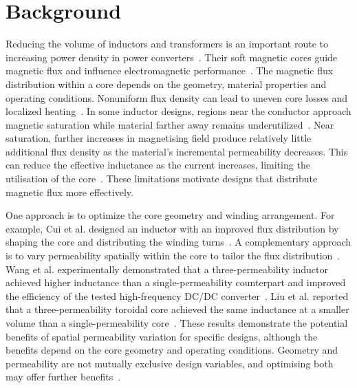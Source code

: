 \section{Background}

Reducing the volume of inductors and transformers is an important route to increasing power density in power converters~\cite{sullivanInvitedPassiveComponent2011}. Their soft magnetic cores guide magnetic flux and influence electromagnetic performance~\cite{valchevInductorsTransformersPower2018}. The magnetic flux distribution within a core depends on the geometry, material properties and operating conditions. Nonuniform flux density can lead to uneven core losses and localized heating~\cite{aghebModificationEmpiricalCore2013}. In some inductor designs, regions near the conductor approach magnetic saturation while material farther away remains underutilized~\cite{wangMultipermeabilityInductorsIncreasing2013}. Near saturation, further increases in magnetising field produce relatively little additional flux density as the material's incremental permeability decreases. This can reduce the effective inductance as the current increases, limiting the utilisation of the core~\cite{valchevInductorsTransformersPower2018,umetaniImprovementSaturationProperty2013}. These limitations motivate designs that distribute magnetic flux more effectively.

One approach is to optimize the core geometry and winding arrangement. For example, Cui et al. designed an inductor with an improved flux distribution by shaping the core and distributing the winding turns~\cite{cuiInductorGeometryImproved2014}. A complementary approach is to vary permeability spatially within the core to tailor the flux distribution~\cite{liuDesignAdditiveManufacturing2018,wangMultipermeabilityInductorsIncreasing2013}. Wang et al. experimentally demonstrated that a three-permeability inductor achieved higher inductance than a single-permeability counterpart and improved the efficiency of the tested high-frequency DC/DC converter~\cite{wangMultipermeabilityInductorsIncreasing2013}. Liu et al. reported that a three-permeability toroidal core achieved the same inductance at a smaller volume than a single-permeability core~\cite{liuDesignAdditiveManufacturing2018}. These results demonstrate the potential benefits of spatial permeability variation for specific designs, although the benefits depend on the core geometry and operating conditions. Geometry and permeability are not mutually exclusive design variables, and optimising both may offer further benefits~\cite{donascimentoMultiobjectiveOptimizationParadigm2021}.

